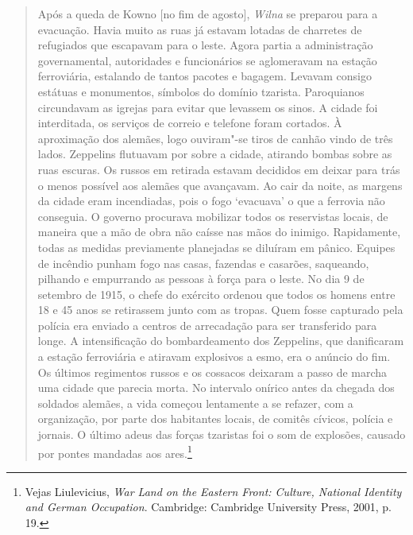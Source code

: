 \begin{quote}
Após a queda de Kowno {[}no fim de agosto{]}, \textit{Wilna} se preparou para a
evacuação. Havia muito as ruas já estavam lotadas de charretes de
refugiados que escapavam para o leste. Agora partia a administração
governamental, autoridades e funcionários se aglomeravam na estação
ferroviária, estalando de tantos pacotes e bagagem. Levavam consigo
estátuas e monumentos, símbolos do domínio tzarista. Paroquianos
circundavam as igrejas para evitar que levassem os sinos. A cidade foi
interditada, os serviços de correio e telefone foram cortados. À
aproximação dos alemães, logo ouviram"-se tiros de canhão vindo de três
lados. Zeppelins flutuavam por sobre a cidade, atirando bombas sobre as
ruas escuras. Os russos em retirada estavam decididos em deixar para
trás o menos possível aos alemães que avançavam. Ao cair da noite, as
margens da cidade eram incendiadas, pois o fogo `evacuava' o que a
ferrovia não conseguia. O governo procurava mobilizar todos os
reservistas locais, de maneira que a mão de obra não caísse nas mãos do
inimigo. Rapidamente, todas as medidas previamente planejadas se
diluíram em pânico. Equipes de incêndio punham fogo nas casas, fazendas
e casarões, saqueando, pilhando e empurrando as pessoas à força para o
leste. No dia 9 de setembro de 1915, o chefe do exército ordenou que
todos os homens entre 18 e 45 anos se retirassem junto com as tropas.
Quem fosse capturado pela polícia era enviado a centros de arrecadação
para ser transferido para longe. A intensificação do bombardeamento dos
Zeppelins, que danificaram a estação ferroviária e atiravam explosivos a
esmo, era o anúncio do fim. Os últimos regimentos russos e os cossacos
deixaram a passo de marcha uma cidade que parecia morta. No intervalo
onírico antes da chegada dos soldados alemães, a vida começou lentamente
a se refazer, com a organização, por parte dos habitantes locais, de
comitês cívicos, polícia e jornais. O último adeus das forças tzaristas
foi o som de explosões, causado por pontes mandadas aos ares.\footnote{Vejas Liulevicius, \textit{War Land on the Eastern Front: Culture, National Identity and German Occupation}. Cambridge: Cambridge University Press, 2001, p. 19.} 
\end{quote}

%

